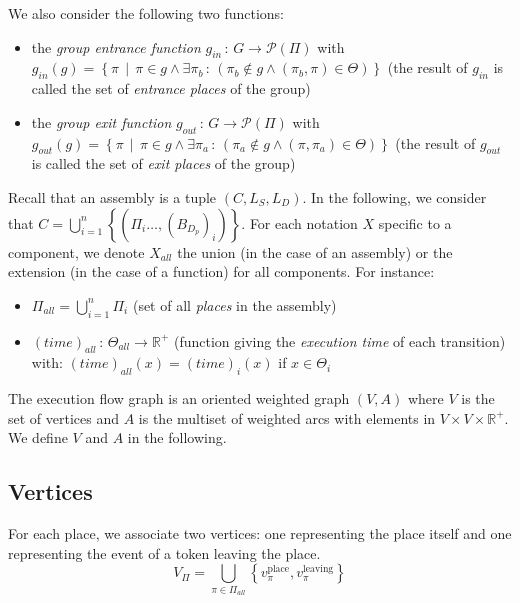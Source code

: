 We also consider the following two functions:
\begin{itemize}
\item the \emph{group entrance function} $g_{in}\,:\,G\rightarrow\mathcal{P}\left(\Pi\right)$ with\\
$g_{in}(g)=\left\{ \pi\,\mid\,\pi\in g\land\exists\pi_{b}\,:\,\left(\pi_{b}\not\in g\land\left(\pi_{b},\pi\right)\in\Theta\right)\right\} $
(the result of $g_{in}$ is called the set of \emph{entrance places}
of the group)
\item the \emph{group exit function} $g_{out}\,:\,G\rightarrow\mathcal{P}\left(\Pi\right)$ with\\
$g_{out}(g)=\left\{ \pi\,\mid\,\pi\in g\land\exists\pi_{a}\,:\,\left(\pi_{a}\not\in g\land\left(\pi,\pi_{a}\right)\in\Theta\right)\right\} $
(the result of $g_{out}$ is called the set of \emph{exit places}
of the group)
\end{itemize}

Recall that an assembly is a tuple $\left(C,L_S,L_D\right)$. In
the following, we consider that
$C=\bigcup_{i=1}^{n}\left\{ \left(\Pi_{i}\dots,\left(B_{D_{p}}\right)_{i}\right)\right\} $.
For each notation $X$ specific to a component, we denote $X_{all}$ the
union (in the case of an assembly) or the extension (in the case of
a function) for all components. For instance:
\begin{itemize}
\item $\Pi_{all}=\bigcup_{i=1}^{n}\Pi_{i}$ (set of all \emph{places} in
the assembly)
\item $\left(time\right)_{all}\,:\,\Theta_{all}\rightarrow\mathbb{R}^{+}$
(function giving the \emph{execution time} of each transition) with:
$\left(time\right)_{all}\left(x\right)=\left(time\right)_{i}\left(x\right)$
if $x\in\Theta_{i}$ 
\end{itemize}
The execution flow graph is an oriented weighted graph \emph{$\left(V,A\right)$}
where $V$ is the set of vertices and $A$ is the multiset of weighted
arcs with elements in $V\times V\times\mathbb{R}^{+}$. We define
$V$ and $A$ in the following.

\subsection{Vertices}

For each place, we associate two vertices: one representing the place
itself and one representing the event of a token leaving the place.
\[
V_{\Pi}=\bigcup_{\pi\in\Pi_{all}}\left\{ v_\pi^\text{place},v_\pi^\text{leaving}\right\} 
\]

